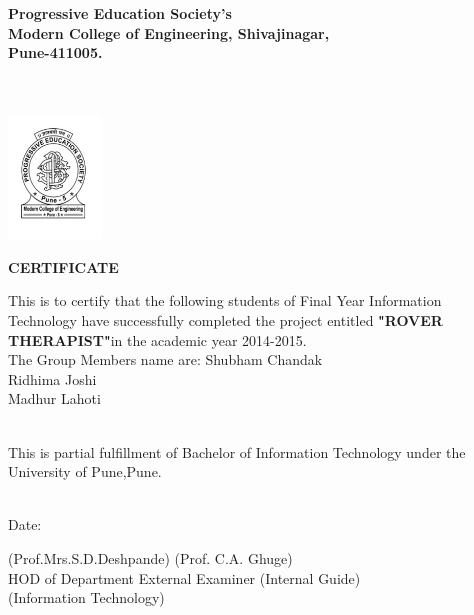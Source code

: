 \documentclass[12pt,a4paper]{article}
\begin{document}
\vspace{0.2in}
\begin{center}
\textbf{\large{Progressive Education Society's}}\\
\textbf{\large{Modern College of Engineering, Shivajinagar,}}\\
\textbf{\large{Pune-411005.}}\\
\\
\\
\vspace{0.2in}
\end{center}

	\begin{center}
\includegraphics[width=2.5cm]{modernlogo}
\end{center}

\begin{center}
\textbf{\large{CERTIFICATE}}\\
\end{center}

		\noindent
  				\setlength{\baselineskip}{1.5\baselineskip}
	\begin{center}
\begin{flushleft}
This is to certify that the following students of Final Year Information Technology have successfully completed the project entitled \textbf{\small"ROVER THERAPIST"}in the academic year 2014-2015.\\
The Group Members name are: Shubham Chandak\\
							Ridhima Joshi\\
							Madhur Lahoti\\
\\
\end{flushleft} 

\begin{flushleft}
This is partial fulfillment of Bachelor of Information Technology under the University of Pune,Pune.

\\
Date:
\\
\end{flushleft}
	\end{center} 
		\vspace{0.6 in}
(Prof.Mrs.S.D.Deshpande)\hspace{2.8 in} (Prof. C.A. Ghuge)\\
HOD of Department\hspace{1 in} External Examiner\hspace{1 in}  (Internal Guide)\\
(Information Technology)\\\\\
\singlespace
\end{document}
